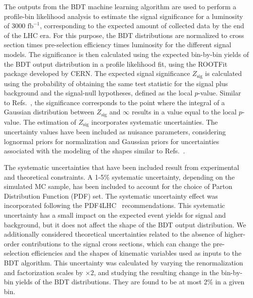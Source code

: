 The outputs from the BDT machine learning algorithm are used to perform a profile-bin likelihood analysis to estimate the signal significance for a luminosity of 3000 $\mathrm{fb^{-1}}$, corresponding to the expected amount of collected data by the end of the LHC era. For this purpose, the BDT distributions are normalized to cross section times pre-selection efficiency times luminosity for the different signal models. The significance is then calculated using the expected bin-by-bin yields of the BDT output distribution in a profile likelihood fit, using the ROOTFit~\parencite{Butterworth:2015oua} package developed by CERN. The expected signal significance $Z_\text{sig}$ is calculated using the probability of obtaining the same test statistic for the  signal plus background and the signal-null hypotheses, defined as the local $p$-value. Similar to Refs.~\parencite{Florez:2021zoo, Florez:2019tqr, Florez:2018ojp, Florez:2017xhf, VBFZprimePaper, Florez:2016lwi, Leonardi_2020}, the significance  corresponds to the point where the integral of a Gaussian distribution between $Z_\text{sig}$ and $\infty$ results in a value equal to the local $p$-value. The estimation of $Z_\text{sig}$ incorporates  systematic uncertainties. The uncertainty values have been included as nuisance parameters, considering lognormal priors for normalization and Gaussian priors for uncertainties associated with the modeling of the shapes similar to Refs.~\parencite{natalia2021longtermlhcdiscoveryreach, PhysRevD.103.095001}. 

The systematic uncertainties that have been included result from experimental and theoretical constraints.   A 1-5\% systematic uncertainty, depending on the simulated MC sample, has been included to account for the choice of Parton Distribution Function (PDF) set. The systematic uncertainty effect was incorporated following the PDF4LHC~\parencite{Butterworth:2015oua} recommendations. This systematic uncertainty has a small impact on the expected event yields for signal and background, but it does not affect the shape of the BDT output distribution. We additionally considered theoretical uncertainties related to the absence of higher-order contributions to the signal cross sections, which can change the pre-selection efficiencies and the shapes of kinematic variables used as inputs to the BDT algorithm. This uncertainty was calculated by varying the renormalization and factorization scales by $\times 2$, and studying the resulting change in the bin-by-bin yields of the BDT distributions. They are found to be at most 2\% in a given bin. 

